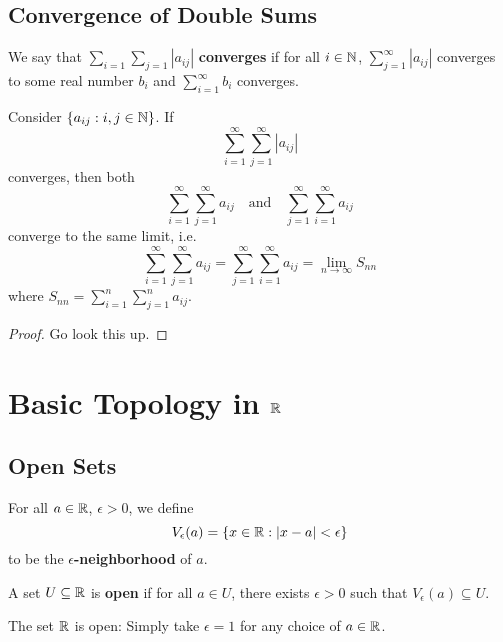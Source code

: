 \subsection{Convergence of Double Sums}
\begin{definition}
  We say that $\sum_{i = 1} \sum_{j = 1} |a_{ij}|$
  \textbf{converges}
  if for all $i \in \mathbb{N}$,
  $\sum_{j = 1}^\infty |a_{ij}|$ converges to some real
  number $b_i$ and $\sum_{i = 1}^\infty b_i$
  converges.
\end{definition}

\begin{theorem}
  Consider $\{a_{ij} : i, j \in \mathbb{N}\}$. If
  \[
    \sum_{i = 1}^\infty \sum_{j = 1}^\infty |a_{ij}|
  \]
  converges, then both
  \[
    \sum_{i = 1}^\infty \sum_{j = 1}^\infty a_{ij} \quad
    \text{and} \quad
    \sum_{j = 1}^\infty \sum_{i = 1}^\infty a_{ij}
  \]
  converge to the same limit, i.e.
  \[
    \sum_{i = 1}^\infty \sum_{j = 1}^\infty a_{ij}
    = \sum_{j = 1}^\infty \sum_{i = 1}^\infty a_{ij}
    = \lim_{n \to \infty} S_{nn}
  \]
  where $S_{nn} = \sum_{i = 1}^n \sum_{j = 1}^n a_{ij}$.
\end{theorem}

\begin{proof}
  Go look this up.
\end{proof}

\section{Basic Topology in \texorpdfstring{$\mathbb{R}$}{R}}
\subsection{Open Sets}
\begin{definition}
  For all $a \in \mathbb{R}$, $\epsilon > 0$, we define
  \[V_\epsilon(a) = \{x \in \mathbb{R} : |x - a| < \epsilon\}\]
  to be the \textbf{$\epsilon$-neighborhood} of $a$.
\end{definition}

\begin{definition}
  A set $U \subseteq \mathbb{R}$ is \textbf{open} if for all
  $a \in U$, there exists $\epsilon > 0$ such that
  $V_\epsilon(a) \subseteq U$.
\end{definition}

\begin{example}
  The set $\mathbb{R}$ is open: Simply take $\epsilon = 1$ for
  any choice of $a \in \mathbb{R}$.
\end{example}

